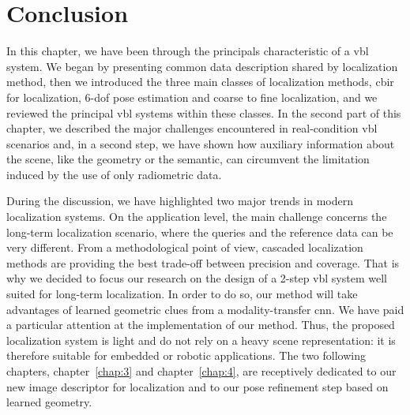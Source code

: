\section{Conclusion}

In this chapter, we have been through the principals characteristic of a \ac{vbl} system. We began by presenting common data description shared by localization method, then we introduced the three main classes of localization methods, \ac{cbir} for localization, 6-\ac{dof} pose estimation and coarse to fine localization, and we reviewed the principal \ac{vbl} systems within these classes. In the second part of this chapter, we described the major challenges encountered in real-condition \ac{vbl} scenarios and, in a second step, we have shown how auxiliary information about the scene, like the geometry or the semantic, can circumvent the limitation induced by the use of only radiometric data.

During the discussion, we have highlighted two major trends in modern localization systems. On the application level, the main challenge concerns the long-term localization scenario, where the queries and the reference data can be very different. From a methodological point of view, cascaded localization methods are providing the best trade-off between precision and coverage. That is why we decided to focus our research on the design of a 2-step \ac{vbl} system well suited for long-term localization. In order to do so, our method will take advantages of learned geometric clues from a modality-transfer \ac{cnn}. We have paid a particular attention at the implementation of our method. Thus, the proposed localization system is light and do not rely on a heavy scene representation: it is therefore suitable for embedded or robotic applications. The two following chapters, chapter~\ref{chap:3} and chapter~\ref{chap:4}, are receptively dedicated to our new image descriptor for localization and to our pose refinement step based on learned geometry.



